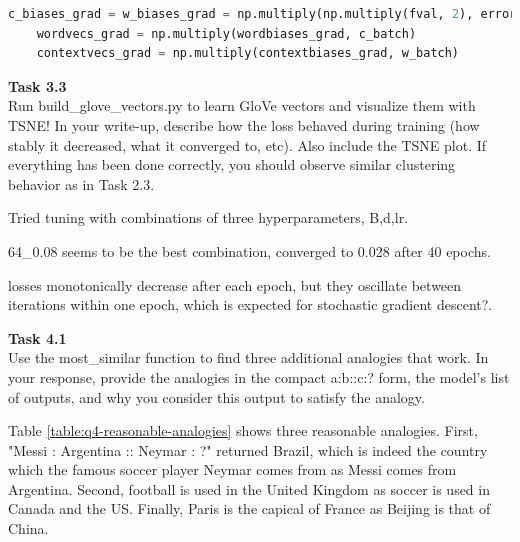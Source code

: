 \documentclass[12pt,article]{article}
\newenvironment{task}[2][Task]
    { \begin{mdframed}[backgroundcolor=gray!20] \textbf{#1 #2} \\}
    {  \end{mdframed}}
\begin{document}
\small{
\begin{lstlisting}[language=Python]
    c_biases_grad = w_biases_grad = np.multiply(np.multiply(fval, 2), error)
    wordvecs_grad = np.multiply(wordbiases_grad, c_batch)
    contextvecs_grad = np.multiply(contextbiases_grad, w_batch)
\end{lstlisting}
}

\begin{task}{3.3} 
Run build\_glove\_vectors.py to learn GloVe vectors and visualize them with TSNE! In your write-up, describe how the loss behaved during training (how stably it decreased, what it converged to, etc). Also include the TSNE plot. If everything has been done correctly, you should observe similar clustering behavior as in Task 2.3.
\end{task}

Tried tuning with combinations of three hyperparameters, B,d,lr. 

64\_0.08 seems to be the best combination, converged to 0.028 after 40 epochs. 

losses monotonically decrease after each epoch, but they oscillate between iterations within one epoch, which is expected for stochastic gradient descent?.
\newpage
\begin{task}{4.1} 
Use the most\_similar function to find three additional analogies that work. In your response, provide the analogies in the compact a:b::c:? form, the model's list of outputs, and why you consider this output to satisfy the analogy.
\end{task}
Table \ref{table:q4-reasonable-analogies} shows three reasonable analogies. First, "Messi : Argentina :: Neymar : ?" returned Brazil, which is indeed the country which the famous soccer player Neymar comes from as Messi comes from Argentina. Second, football is used in the United Kingdom as soccer is used in Canada and the US. Finally, Paris is the capical of France as Beijing is that of China.
\end{document}
